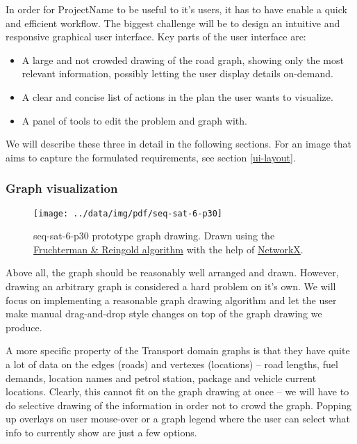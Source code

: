 \documentclass[10pt,a4paper,oneside]{article}
\newcommand{\pname}{ProjectName} %
\begin{document}
In order for \pname{} to be useful to it's users, it has to have enable a quick and efficient workflow.
The biggest challenge will be to design an intuitive and responsive graphical user interface.
Key parts of the user interface are:
\begin{itemize}
\item A large and not crowded drawing of the road graph, showing only the most relevant information, possibly letting the user display details on-demand.
\item A clear and concise list of actions in the plan the user wants to visualize.
\item A panel of tools to edit the problem and graph with.
\end{itemize}

We will describe these three in detail in the following sections. For an image that aims to capture the formulated requirements, see section \ref{ui-layout}.

\subsubsection{Graph visualization} \label{graphviz}

\begin{wrapfigure}{r}{0.5\textwidth}
        \texttt{[image: ../data/img/pdf/seq-sat-6-p30]}
        \caption{seq-sat-6-p30 prototype graph drawing. Drawn using the
         \href{http://emr.cs.iit.edu/~reingold/force-directed.pdf}{Fruchterman \& Reingold algorithm}
         with the help of  \href{https://networkx.github.io/}{NetworkX}.}
        \label{fig:graph}
\end{wrapfigure}

Above all, the graph should be reasonably well arranged and drawn. However, drawing an arbitrary graph is considered a hard problem on it's own.
We will focus on implementing a reasonable graph drawing algorithm and let the user make manual drag-and-drop style changes on top of the graph drawing we produce.

A more specific property of the Transport domain graphs is that they have quite a lot of data on the edges (roads) and vertexes (locations) -- road lengths, fuel demands, location names and petrol station, package and vehicle current locations.
Clearly, this cannot fit on the graph drawing at once -- we will have to do selective drawing of the information in order
not to crowd the graph.
Popping up overlays on user mouse-over
or a graph legend where the user can select what info to currently show are just a few options.
\end{document}

